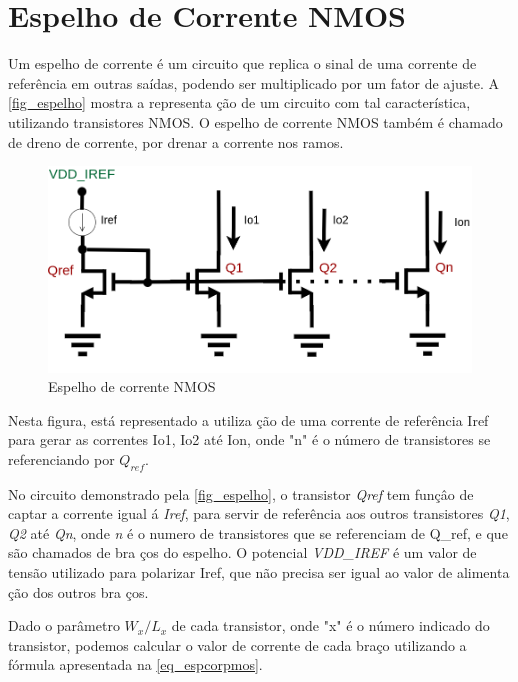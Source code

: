 \label{anexoespelhos}

\section{Espelho de Corrente NMOS}

Um espelho de corrente \'e um circuito que replica o sinal de uma corrente de refer\^encia em outras sa\'idas, podendo ser multiplicado por um fator de ajuste. A \autoref{fig_espelho} mostra a representa ção de um circuito com tal caracter\'istica, utilizando transistores NMOS. O espelho de corrente NMOS tamb\'em \'e chamado de dreno de corrente, por drenar a corrente nos ramos.

\begin{figure}[htb]
    \label{fig_espelho}
    \centering
    \caption{Espelho de corrente NMOS} 
    \includegraphics[scale=0.4]{Circuitos/current_mirror_example.png}
\end{figure}

Nesta figura, est\'a representado a utiliza ção de uma corrente de refer\^encia Iref para gerar as correntes Io1, Io2 at\'e Ion, onde "n" \'e o n\'umero de transistores se referenciando por $Q_{ref}$.

No circuito demonstrado pela \autoref{fig_espelho}, o transistor \emph{Qref} tem funç\^ao de captar a corrente igual \'a \emph{Iref}, para servir de refer\^encia aos outros transistores \emph{Q1}, \emph{Q2} at\'e \emph{Qn}, onde \emph{n} \'e o numero de transistores que se referenciam de Q\_ref, e que são chamados de bra ços do espelho. O potencial \emph{VDD\_IREF} \'e um valor de tensão utilizado para polarizar Iref, que não precisa ser igual ao valor de alimenta ção dos outros bra ços.

Dado o parâmetro $W_x/L_x$ de cada transistor, onde "x" é o número indicado do transistor, podemos calcular o valor de corrente de cada braço utilizando a fórmula apresentada na \autoref{eq_espcorpmos}.

